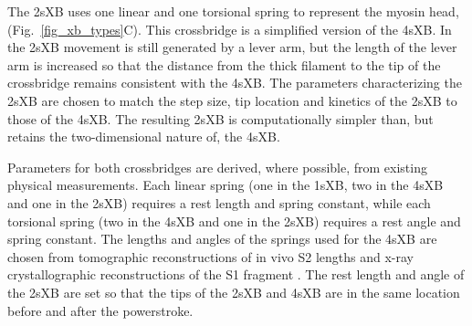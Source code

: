 \documentclass[]{article}
\begin{document}
The 2sXB uses one linear and one torsional spring to represent the myosin head, (Fig.~\ref{fig_xb_types}C).
This crossbridge is a simplified version of the 4sXB. 
In the 2sXB movement is still generated by a lever arm, but the length of the lever arm is increased so that the distance from the thick filament to the tip of the crossbridge remains consistent with the 4sXB.
The parameters characterizing the 2sXB are chosen to match the step size, tip location and kinetics of the 2sXB to those of the 4sXB. 
The resulting 2sXB is computationally simpler than, but retains the two-dimensional nature of, the 4sXB.

Parameters for both crossbridges are derived, where possible, from existing physical measurements.
Each linear spring (one in the 1sXB, two in the 4sXB and one in the 2sXB) requires a rest length and spring constant, while each torsional spring (two in the 4sXB and one in the 2sXB) requires a rest angle and spring constant.
The lengths and angles of the springs used for the 4sXB are chosen from tomographic reconstructions of in vivo S2 lengths and x-ray crystallographic reconstructions of the S1 fragment \citep{Taylor1999, Rayment1993}.
The rest length and angle of the 2sXB are set so that the tips of the 2sXB and 4sXB are in the same location before and after the powerstroke.


\end{document}
